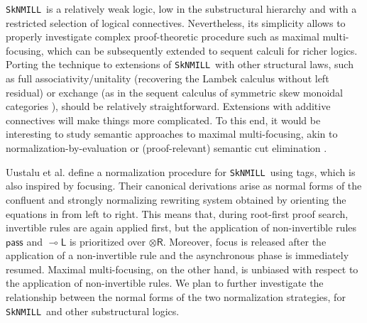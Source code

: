 \documentclass[runningheads]{llncs}
\newcommand{\tr}{\otimes \mathsf{R}}
\newcommand{\lleft}{{\multimap}\mathsf{L}}
\newcommand{\pass}{\mathsf{pass}}
\newcommand{\otR}{\tr}
\newcommand{\lolliL}{\lleft}
\newcommand{\SkNMILL}{\texttt{SkNMILL}}
\newcommand{\focus}{\mathsf{focus}}
\begin{document}
\SkNMILL\ is a relatively weak logic, low in the substructural hierarchy and with a restricted selection of logical connectives. Nevertheless, its simplicity allows to properly investigate complex proof-theoretic procedure such as maximal multi-focusing, which can be subsequently extended to sequent calculi for richer logics. Porting the technique to extensions of \SkNMILL\ with other structural laws, such as full associativity/unitality (recovering the Lambek calculus without left residual) or exchange (as in the sequent calculus of symmetric skew monoidal categories \cite{veltri:coherence:2021}), should be relatively straightforward. Extensions with additive connectives will make things more complicated. To this end, it would be interesting to study semantic approaches to maximal multi-focusing, akin to normalization-by-evaluation \cite{ADHS:noretl,NbELambek} or (proof-relevant) semantic cut elimination \cite{Okada99}.

Uustalu et al. \cite{UVW:protsn} define a normalization procedure for \SkNMILL\ using tags, which is also inspired by focusing. Their canonical derivations arise as normal forms of the confluent and strongly normalizing rewriting system obtained by orienting the equations in  from left to right. This means that, during root-first proof search, invertible rules are again applied first, but the application of non-invertible rules $\pass$ and $\lolliL$ is prioritized over $\otR$. Moreover, focus is released after the application of a non-invertible rule and the asynchronous phase is immediately resumed. Maximal multi-focusing, on the other hand, is unbiased with respect to the application of non-invertible rules. We plan to further investigate the relationship between the normal forms of the two normalization strategies, for \SkNMILL\ and other substructural logics.




\end{document}
